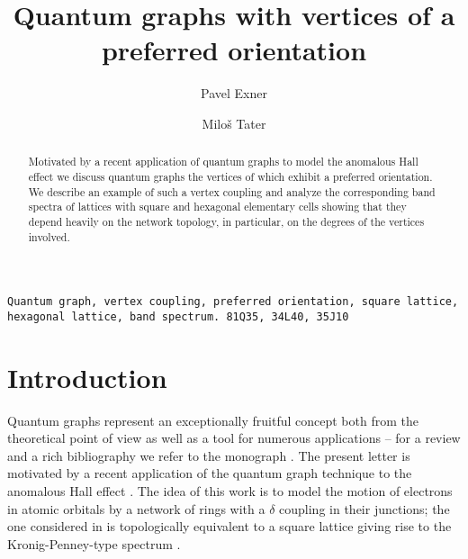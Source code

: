 \documentclass[english]{elsarticle}
\begin{document}
\begin{frontmatter}

\title{Quantum graphs with vertices of a preferred orientation}

\author[mymainaddress,mysecondaryaddress]{Pavel Exner}
\author[mymainaddress]{Milo\v{s} Tater}

\address[mymainaddress]{Department of Theoretical Physics, Nuclear Physics Institute, Czech Academy of Sciences, 25068 \v Re\v z near Prague, Czechia}
\address[mysecondaryaddress]{Doppler Institute for Mathematical Physics and Applied Mathematics, Czech Technical University, B\v rehov\'a 7, 11519 Prague, Czechia}

\begin{abstract}
Motivated by a recent application of quantum graphs to model the anomalous Hall effect we discuss quantum graphs the vertices of which exhibit a preferred orientation. We describe an example of such a vertex coupling and analyze the corresponding band spectra of lattices with square and hexagonal elementary cells showing that they depend heavily on the network topology, in particular, on the degrees of the vertices involved.
\end{abstract}

\begin{keyword}
\texttt{Quantum graph, vertex coupling, preferred orientation, square lattice, hexagonal lattice, band spectrum. \MSC[2010] 81Q35, 34L40, 35J10}
\end{keyword}

\end{frontmatter}


\section{Introduction}

Quantum graphs represent an exceptionally fruitful concept both from the theoretical point of view as well as a tool for numerous applications -- for a review and a rich bibliography we refer to the monograph \cite{BK13}. The present letter is motivated by a recent application of the quantum graph technique to the anomalous Hall effect \cite{SK15}. The idea of this work is to model the motion of electrons in atomic orbitals by a network of rings with a $\delta$ coupling in their junctions; the one considered in \cite{SK15} is topologically equivalent to a square lattice giving rise to the Kronig-Penney-type spectrum \cite{Ex95}.
\end{document}
